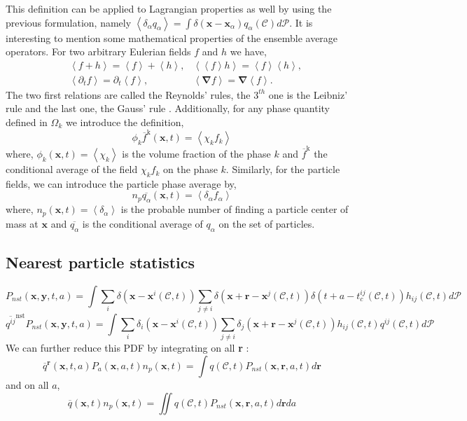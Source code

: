 \documentclass[12pt]{My_preprint}
\newcommand{\avg}[1]{\left<#1\right>}
\renewcommand{\avg}[1]{\left<#1\right>}
\newcommand{\pavg}[1]{\avg{\delta_\alpha #1}}
\newcommand{\avgcond}[1]{\left<#1\right>}
\renewcommand{\avgcond}[1]{\overline{#1}}
\newcommand{\condavg}[2]{\overline{#1}^{#2}}
\newcommand{\kavg}[1]{\avgcond{#1}^\text{k}}
\newcommand{\pnnavg}[1]{\avgcond{#1}}
\newcommand{\pnavg}[1]{n_p\pnnavg{#1}}
\newcommand{\nstavg}[1]{\overline{#1}^\text{nst}}
\newcommand{\nablab}{\mathbf{\nabla}}
\newcommand{\nablabh}{\nablab}
\newcommand{\pddt}{\frac{\partial}{\partial t}}
\renewcommand{\pddt}{\partial_t}
\newcommand{\CC}{\mathscr{C}}
\begin{document}
This definition can be applied to Lagrangian properties as well by using the previous formulation, namely $\pavg{q_\alpha} = \int \delta(\textbf{x} - \textbf{x}_\alpha) q_\alpha(\mathscr{C}) d\mathscr{P}. $
It is interesting to mention some mathematical properties of the ensemble average operators. 
For two arbitrary Eulerian fields $f$ and $h$ we have,
\begin{align}
    &\avg{f+h} = \avg{f}+\avg{h}, 
    &\avg{\avg{f}h} = \avg{f}\avg{h}, \nonumber \\
    &\avg{\pddt f} 
    = \pddt\avg{f}, 
    &\avg{\nablabh f}
    = \nablab \avg{f}. 
    \label{eq:avg_properties}
\end{align}
The two first relations are called the Reynolds' rules, the $3^{th}$ one is the Leibniz' 
rule and the last one, the Gauss' rule \citep{drew1983mathematical}.
Additionally, for any phase quantity defined in $\Omega_k$ we introduce the definition, 
\begin{equation}
    \phi_k\kavg{f}(\textbf{x},t) = \avg{\chi_k f_k}
    \label{eq:1_avg}
\end{equation}
where, $\phi_k(\textbf{x},t) = \avg{\chi_k}$ is the volume fraction of the phase $k$
and $\kavg{f}$ the conditional average of the field $\chi_k f_k$ on the phase $k$.
Similarly, for the particle fields, we can introduce the particle phase average by,
\begin{equation}
     \pnavg{q_\alpha}(\textbf{x},t) = \avg{\delta_\alpha f_\alpha}
     \label{eq:p_avg}
\end{equation}
where, $n_p(\textbf{x},t) = \avg{\delta_\alpha}$ is the probable number of finding a particle center of mass at $\textbf{x}$
and $\pnnavg{q_\alpha}$ is the conditional average of $q_\alpha$ on the set of particles. 
\subsection{Nearest particle statistics}

\begin{equation}
    P_{nst}(\textbf{x},\textbf{y},t,a)= 
    \int \sum_{i}\delta(\textbf{x}-\textbf{x}^i(\CC,t))
    \sum_{j\neq i}\delta(\textbf{x}+\textbf{r}-\textbf{x}^j(\CC,t)) 
    \delta(t+a-t_c^{ij}(\CC,t)) 
    h_{ij}(\CC,t) d\mathscr{P} 
    \label{eq:P_nst}
\end{equation}
\begin{equation}
    \nstavg{q^{ij}}P_{nst}(\textbf{x},\textbf{y},t,a)= \int \sum_{i}\delta_i(\textbf{x}-\textbf{x}^i(\CC,t))
    \sum_{j\neq i}\delta_j(\textbf{x}+\textbf{r}-\textbf{x}^j(\CC,t)) h_{ij}(\CC,t) q^{ij}(\CC,t) d\mathscr{P} 
    \label{eq:q_nst_avg}
\end{equation}
We can further reduce this PDF by integrating on all \textbf{r} : 
\begin{equation}
    \condavg{q}{\textbf{r}}(\textbf{x},t,a)P_a(\textbf{x},a,t)n_p(\textbf{x},t)
    = \int q(\CC,t) P_{nst}(\textbf{x},\textbf{r},a,t) d\textbf{r}
\end{equation}
and on all $a$, 
\begin{equation}
    \avgcond{q}(\textbf{x},t)n_p(\textbf{x},t)
    = \iint q(\CC,t) P_{nst}(\textbf{x},\textbf{r},a,t) d\textbf{r}da
\end{equation}
\end{document}
